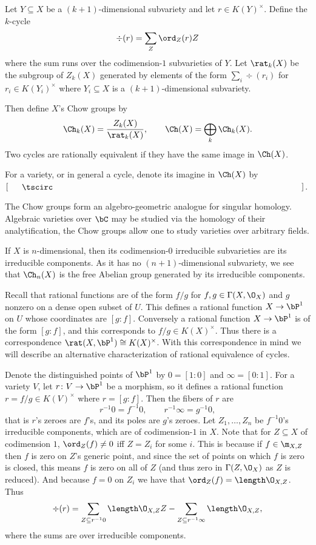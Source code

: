 \bdefn

    Let $Y\subseteq X$ be a $(k+1)$-dimensional subvariety and let $r\in K(Y)^\times$.
    Define the $k$-cycle
    $$ \div(r) = \sum_Z\ord_Z(r)Z $$
    where the sum runs over the codimension-$1$ subvarieties of $Y$.
    Let $\rat_k(X)$ be the subgroup of $Z_k(X)$ generated by elements of the form $\sum_i\div(r_i)$
    for $r_i\in K(Y_i)^\times$ where $Y_i\subseteq X$ is a $(k+1)$-dimensional subvariety.

    Then define $X$'s {\emphcolor Chow groups} by
    $$ \Ch_k(X) = \frac{Z_k(X)}{\rat_k(X)},\qquad \Ch(X) = \bigoplus_k\Ch_k(X) . $$
    Two cycles are {\emphcolor rationally equivalent} if they have the same image in $\Ch(X)$.

\edefn

For a variety, or in general a cycle, denote its imagine in $\Ch(X)$ by $[\bul]$.

The Chow groups form an algebro-geometric analogue for singular homology.
Algebraic varieties over $\bC$ may be studied via the homology of their analytification, the Chow groups allow one to study varieties
over arbitrary fields.

\bexam

    If $X$ is $n$-dimensional, then its codimension-$0$ irreducible subvarieties are its irreducible components.
    As it has no $(n+1)$-dimensional subvariety, we see that $\Ch_n(X)$ is the free Abelian group generated by its irreducible components.

\eexam

Recall that rational functions are of the form $f/g$ for $f,g\in\Gamma(X,\O_X)$ and $g$ nonzero on a dense open subset of $U$.
This defines a rational function $X\to\bP^1$ on $U$ whose coordinates are $[g:f]$.
Conversely a rational function $X\to\bP^1$ is of the form $[g:f]$, and this corresponds to $f/g\in K(X)^\times$.
Thus there is a correspondence $\rat(X,\bP^1)\cong K(X)^\times$.
With this correspondence in mind we will describe an alternative characterization of rational equivalence of cycles.

Denote the distinguished points of $\bP^1$ by $0=[1:0]$ and $\infty=[0:1]$.
For a variety $V$, let $r\colon V\to\bP^1$ be a morphism, so it defines a rational function $r=f/g\in K(V)^\times$ where $r=[g:f]$.
Then the fibers of $r$ are
$$ r^{-1}0 = f^{-1}0,\qquad r^{-1}\infty = g^{-1}0 , $$
that is $r$'s zeroes are $f$'s, and its poles are $g$'s zeroes.
Let $Z_1,\dots,Z_n$ be $f^{-1}0$'s irreducible components, which are of codimension-$1$ in $X$.
Note that for $Z\subseteq X$ of codimension $1$, $\ord_Z(f)\neq0$ iff $Z=Z_i$ for some $i$.
This is because if $f\in\m_{X,Z}$ then $f$ is zero on $Z$'s generic point, and since the set of points on which $f$ is zero is closed, this means $f$
is zero on all of $Z$ (and thus zero in $\Gamma(Z,\O_X)$ as $Z$ is reduced).
And because $f=0$ on $Z_i$ we have that $\ord_Z(f)=\length\O_{X,Z}$.
Thus
$$ \div(r) = \sum_{Z\subseteq r^{-1}0}\length\O_{X,Z}Z - \sum_{Z\subseteq r^{-1}\infty}\length\O_{X,Z} , $$
where the sums are over irreducible components.

